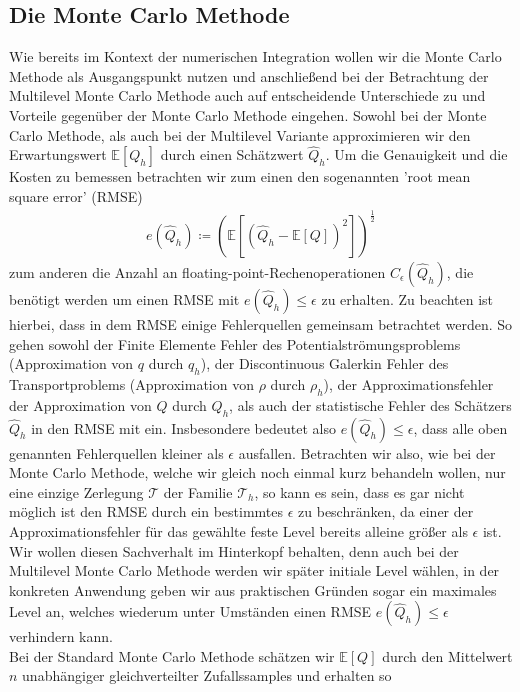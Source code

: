 \subsection{Die Monte Carlo Methode}
Wie bereits im Kontext der numerischen Integration wollen wir die Monte Carlo Methode als Ausgangspunkt nutzen und anschließend bei der Betrachtung der Multilevel Monte Carlo Methode auch auf entscheidende Unterschiede zu und Vorteile gegenüber der Monte Carlo Methode eingehen.
Sowohl bei der Monte Carlo Methode, als auch bei der Multilevel Variante approximieren wir den Erwartungswert $ \mathbb{E}[Q_h] $ durch einen Schätzwert $ \widehat{Q}_h $. Um die Genauigkeit und die Kosten zu bemessen betrachten wir zum einen den sogenannten 'root mean square error' (RMSE) 
\begin{align}
	\label{RMSE}
	e( \widehat{Q}_h) \coloneqq \left(  \mathbb{E} \left[ (\widehat{Q}_h - \mathbb{E}[Q] )^2 \right] \right)^{\frac{1}{2}}
\end{align}
zum anderen die Anzahl an floating-point-Rechenoperationen $ C_{\epsilon}(\widehat{Q}_h) $, die benötigt werden um einen RMSE mit $ e( \widehat{Q}_h) \leq \epsilon $ zu erhalten.
Zu beachten ist hierbei, dass in dem RMSE einige Fehlerquellen gemeinsam betrachtet werden. So gehen sowohl der Finite Elemente Fehler des Potentialströmungsproblems (Approximation von $ q $ durch $ q_h $), der Discontinuous Galerkin Fehler des Transportproblems (Approximation von $ \rho $ durch $ \rho_h $), der Approximationsfehler der Approximation von $ Q $ durch $ Q_h $, als auch der statistische Fehler des Schätzers $\widehat{Q}_h$ in den RMSE mit ein. Insbesondere bedeutet also $ e( \widehat{Q}_h) \leq \epsilon $, dass alle oben genannten Fehlerquellen kleiner als $ \epsilon $ ausfallen. Betrachten wir also, wie bei der Monte Carlo Methode, welche wir gleich noch einmal kurz behandeln wollen, nur eine einzige Zerlegung $ \mathcal{T} $ der Familie $ \mathcal{T}_h $, so kann es sein, dass es gar nicht möglich ist den RMSE durch ein bestimmtes $ \epsilon $ zu beschränken, da einer der Approximationsfehler für das gewählte feste Level bereits alleine größer als $ \epsilon $ ist. Wir wollen diesen Sachverhalt im Hinterkopf behalten, denn auch bei der Multilevel Monte Carlo  Methode werden wir später initiale Level wählen, in der konkreten Anwendung geben wir aus praktischen Gründen sogar ein maximales Level an, welches wiederum unter Umständen einen RMSE $ e( \widehat{Q}_h) \leq \epsilon $ verhindern kann.\\
Bei der Standard Monte Carlo Methode schätzen wir $ \mathbb{E}[Q] $ durch den Mittelwert  $ n $ unabhängiger gleichverteilter Zufallssamples und erhalten so 
